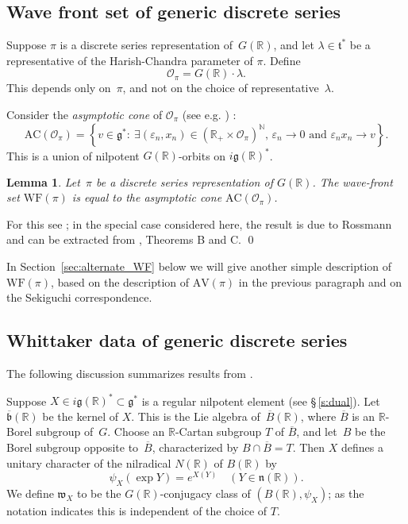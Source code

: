 \documentclass[cupthm]{CUP-JNL-JMJ}
\numberwithin{equation}{section}
\theoremstyle{cupplain}
\newtheorem{lemma}[theorem]{Lemma}
\theoremstyle{cupdefinition}
\theoremstyle{cupremark}
\theoremstyle{cupproof}
\newcommand{\R}{\mathbb R}
\newcommand{\n}{\mathfrak n}
\renewcommand{\t}{\mathfrak t}
\newcommand{\g}{\mathfrak g}
\newcommand{\w}{\mathfrak w}
\newcommand{\AV}{\mathrm{AV}}
\newcommand{\WF}{\mathrm{WF}}
\newcommand{\AC}{\mathrm{AC}}
\begin{document}
\subsection{Wave front set of generic discrete series}\label{sec:asymp_cone}


Suppose $\pi$ is a discrete series representation of~$G(\R)$, and let $\lambda\in\t^*$ be a representative of the Harish-Chandra parameter of $\pi$.
Define
\begin{equation} \label{semisimple_orbit_HC} \mathcal{O}_{\pi}=G(\R)\cdot\lambda.\end{equation}
This depends only on~$\pi$, and not on the choice of representative~$\lambda$. 

Consider the \emph{asymptotic cone} of $\mathcal{O}_\pi$ (see e.g. \cite[Section 3]{AVAV}) :
\[ \AC(\mathcal{O}_\pi) = \left\{ v \in \g^*  :\ \text{$\exists (\varepsilon_n, x_n)\in (\R_+ \times \mathcal{O}_\pi)^\mathbb{N}$, $\varepsilon_n \to 0$ and $\varepsilon_n x_n \to v$}  \right\}. \]
This is a union of nilpotent $G(\R)$-orbits on $i\g(\R)^*$.

\begin{lemma} \label{lem:WF_and_AC}
Let~$\pi$ be a discrete series representation of $G(\R)$. The wave-front set $\WF(\pi)$ is equal to the asymptotic cone $\AC(\mathcal{O}_\pi)$.
\end{lemma}

For this see \cite{HarrisHeOlafsson}; in the special case considered here, the result is due to Rossmann and can be extracted from \cite{RossmannPicard}, Theorems B and C. \qed

In Section~\ref{sec:alternate_WF} below we will give another simple
description of~$\WF(\pi)$, based on the description of $\AV(\pi)$ in
the previous paragraph and on the Sekiguchi correspondence.

\subsection{Whittaker data of generic discrete series}
\label{s:gds}

The following discussion summarizes results from \cite[Section~3]{adams_kaletha}.


Suppose $X\in i\g(\R)^*\subset \g^*$ is a regular nilpotent element (see \S\,{}\ref{s:dual}).
Let $\overline{\mathfrak b}(\R)$ be the kernel of $X$. This is the Lie algebra of~$\overline{B}(\R)$, where
$\overline{B}$ is an $\R$-Borel subgroup of~$G$.
Choose an $\R$-Cartan subgroup $T$ of
$\overline B$, and let~$B$ be the  Borel
subgroup opposite to~$\overline{B}$, characterized by $B\cap \overline B=T$.
Then $X$ defines a unitary
character of the nilradical  $N(\R)$  of $B(\R)$ by
\[ 
\psi_X(\exp Y)=e^{X(Y)}\quad (Y\in\n(\R)).
\] 
We define $\w_X$ to be the $G(\R)$-conjugacy class of $(B(\R),\psi_X)$; as the notation indicates this is independent 
of the choice of $T$.
\end{document}
